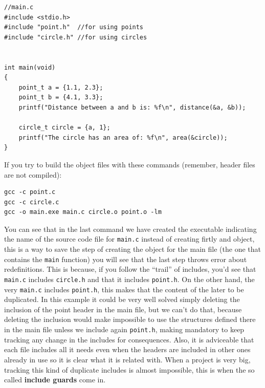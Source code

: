 \documentclass[a4paper]{article}
\begin{document}
\noindent
\begin{minipage}[H]{\linewidth}
\mbox{}
\begin{lstlisting}[style=C,
caption={Redefinition example -- \texttt{main.c}},
label={lst:redefInclude}]
//main.c
#include <stdio.h>
#include "point.h"  //for using points
#include "circle.h" //for using circles


int main(void)
{
    point_t a = {1.1, 2.3};
    point_t b = {4.1, 3.3};
    printf("Distance between a and b is: %f\n", distance(&a, &b));

    circle_t circle = {a, 1};
    printf("The circle has an area of: %f\n", area(&circle));
}
\end{lstlisting}
\end{minipage}


If you try to build the object files with these commands (remember, header
files are not compiled):

\noindent
\begin{minipage}[H]{\linewidth}
\mbox{}
\begin{lstlisting}[style=terminalStyle]
gcc -c point.c
gcc -c circle.c
gcc -o main.exe main.c circle.o point.o -lm
\end{lstlisting}
\end{minipage}

You can see that in the last command we have created the executable indicating
the name of the source code file for \verb!main.c! instead of creating firtly
and object, this is a way to save the step of creating the object for the main
file (the one that contains the \verb!main! function) you will see that the last
step throws error about redefinitions. This is because, if you follow the
``trail'' of includes, you'd see that \verb!main.c! includes \verb!circle.h! and
that it includes \verb!point.h!. On the other hand, the very \verb!main.c!
includes \verb!point.h!, this makes that the content of the later to be
duplicated. In this example it could be very well solved simply deleting the
inclusion of the point header in the main file, but we can't do that, because
deleting the inclusion would make impossible to use the structures defined there
in the main file unless we include again \verb!point.h!, making mandatory to
keep tracking any change in the includes for consequences. Also, it is
adviceable that each file includes all it needs even when the headers are
included in other ones already in use so it is clear what it is related with.
When a project is very big, tracking this kind of duplicate includes is almost
impossible, this is when the so called \textbf{include guards} come in.
\end{document}
